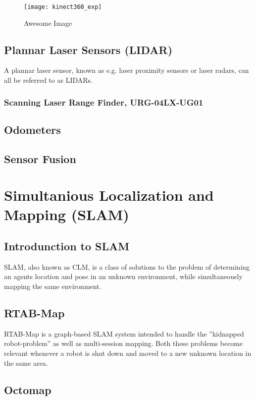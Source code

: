 \begin{figure}[p]
    \centering
    \texttt{[image: kinect360\_exp]}
    \caption{Awesome Image}
    \label{fig:kinect360_exp}
\end{figure}


\subsection{Plannar Laser Sensors (LIDAR)}

A plannar laser sensor, known as e.g. laser proximity sensors or laser radars, can all be referred to as LIDARs. 

\subsubsection{Scanning Laser Range Finder, URG-04LX-UG01}


\subsection{Odometers}

\subsection{Sensor Fusion}


\section{Simultanious Localization and Mapping (SLAM)}

\subsection{Introdunction to SLAM}

\ac{SLAM}, also known as \ac{CLM}, is a class of solutions to the problem of determining an agents location and pose in an unknown environment, while simultaneously mapping the same environment.

\subsection{RTAB-Map}

\ac{RTAB-Map} is a graph-based \ac{SLAM} system intended to handle the ''kidnapped robot-problem'' as well as multi-session mapping\cite{RTAB_map}. Both these problems become relevant whenever a robot is shut down and moved to a new unknown location in the same area. 

\subsection{Octomap}

